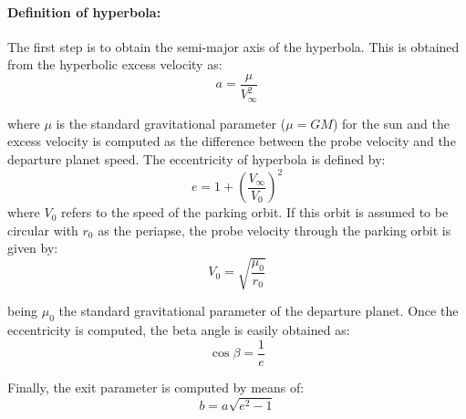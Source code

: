 \paragraph{Definition of hyperbola:}
The first step is to obtain the semi-major axis of the hyperbola. This is obtained from the hyperbolic excess velocity as:
\begin{equation}
	a = \frac{\mu}{V_\infty^2}
\end{equation}

where $\mu$ is the standard gravitational parameter ($\mu=GM$) for the sun and the excess velocity is computed as the difference between the probe velocity and the departure planet speed. The eccentricity of hyperbola is defined by:
\begin{equation}
	e=1+\left(\frac{V_\infty}{V_0}\right)^2
\end{equation}
where $V_0$ refers to the speed of the parking orbit. If this orbit is assumed to be circular with $r_0$ as the periapse, the probe velocity through the parking orbit is given by:
\begin{equation}
	V_0=\sqrt{\frac{\mu_0}{r_0}}
\end{equation}

being $\mu_0$ the standard gravitational parameter of the departure planet. Once the eccentricity is computed, the beta angle is easily obtained as:
\begin{equation}
	\cos \beta = \frac{1}{e}
\end{equation}

Finally, the exit parameter is computed by means of:
\begin{equation}
	b=a\sqrt{e^2-1}
\end{equation}

